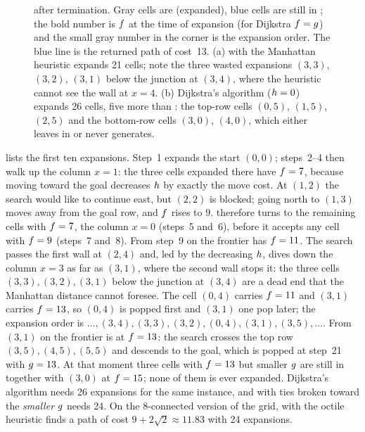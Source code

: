 \begin{figure}[tb]
  \centering
  \caption{ after termination. Gray cells are \Closed
  (expanded), blue cells are still in \Open; the bold number is $f$ at the
  time of expansion (for Dijkstra $f = g$) and the small gray number
  in the corner is the expansion order. The blue line is the returned path of
  cost~13. (a) \astar with the Manhattan heuristic expands 21 cells; note the
  three wasted expansions $(3, 3)$, $(3, 2)$, $(3, 1)$ below the junction at
  $(3, 4)$, where the heuristic cannot see the wall at $x = 4$. (b) Dijkstra's
  algorithm ($h = 0$) expands 26 cells, five more than \astar: the top-row
  cells $(0, 5)$, $(1, 5)$, $(2, 5)$ and the bottom-row cells $(3, 0)$,
  $(4, 0)$, which \astar either leaves in \Open or never generates.}
  \label{fig:ch04-example}
\end{figure}

 lists the first ten expansions. Step~1 expands the start
$(0, 0)$; steps~2--4 then walk up the column $x = 1$: the three cells expanded
there have $f = 7$, because moving toward the
goal decreases $h$ by exactly the move cost. At $(1, 2)$ the search would
like to continue east, but $(2, 2)$ is blocked; going north to $(1, 3)$ moves
away from the goal row, and $f$ rises to $9$. \astar therefore turns to the
remaining cells with $f = 7$, the column $x = 0$ (steps~5 and~6), before it
accepts any cell with $f = 9$ (steps~7 and~8). From step~9 on the
frontier has $f = 11$. The search passes the first wall at $(2, 4)$ and,
led by the decreasing $h$, dives down the column $x = 3$ as far as
$(3, 1)$, where the second wall stops it: the three cells $(3, 3), (3, 2),
(3, 1)$ below the junction at $(3, 4)$ are a dead end that the Manhattan
distance cannot foresee. The cell $(0,4)$ carries $f = 11$ and $(3,1)$
carries $f = 13$, so $(0,4)$ is popped first and $(3,1)$ one pop later; the
expansion order is $\dots, (3, 4), (3, 3), (3, 2), (0, 4), (3, 1), (3, 5),
\dots$. From $(3,1)$ on the frontier is at $f = 13$: the search crosses the
top row $(3, 5), (4, 5), (5, 5)$ and descends to the goal, which is popped at
step~21 with $g = 13$. At that moment three cells with
$f = 13$ but smaller $g$ are still in \Open together with $(3, 0)$ at
$f = 15$; none of them is ever expanded. Dijkstra's algorithm needs 26
expansions for the same instance, and \astar with ties broken toward the
\emph{smaller} $g$ needs 24. On the 8-connected version of the grid, \astar
with the octile heuristic finds a path of cost $9 + 2\sqrt{2} \approx 11.83$
with 24 expansions.

